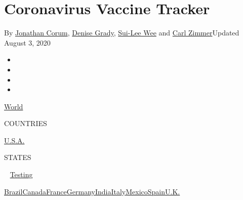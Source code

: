 \hypertarget{coronavirus-vaccine-tracker}{%
\section{Coronavirus Vaccine
Tracker}\label{coronavirus-vaccine-tracker}}

By \href{https://www.nytimes3xbfgragh.onion/by/jonathan-corum}{Jonathan
Corum}, \href{https://www.nytimes3xbfgragh.onion/by/denise-grady}{Denise
Grady}, \href{https://www.nytimes3xbfgragh.onion/by/sui-lee-wee}{Sui-Lee
Wee} and \href{https://www.nytimes3xbfgragh.onion/by/carl-zimmer}{Carl
Zimmer}Updated August 3, 2020

\begin{itemize}
\item
\item
\item
\item
\end{itemize}

\href{https://www.nytimes3xbfgragh.onion/interactive/2020/world/coronavirus-maps.html}{World}~

COUNTRIES

\textbar{}
\href{https://www.nytimes3xbfgragh.onion/interactive/2020/us/coronavirus-us-cases.html}{U.S.A.}~

STATES

~
\href{https://www.nytimes3xbfgragh.onion/interactive/2020/us/coronavirus-testing.html}{Testing}

\href{https://www.nytimes3xbfgragh.onion/interactive/2020/world/americas/brazil-coronavirus-cases.html}{Brazil}\href{https://www.nytimes3xbfgragh.onion/interactive/2020/world/canada/canada-coronavirus-cases.html}{Canada}\href{https://www.nytimes3xbfgragh.onion/interactive/2020/world/europe/france-coronavirus-cases.html}{France}\href{https://www.nytimes3xbfgragh.onion/interactive/2020/world/europe/germany-coronavirus-cases.html}{Germany}\href{https://www.nytimes3xbfgragh.onion/interactive/2020/world/asia/india-coronavirus-cases.html}{India}\href{https://www.nytimes3xbfgragh.onion/interactive/2020/world/europe/italy-coronavirus-cases.html}{Italy}\href{https://www.nytimes3xbfgragh.onion/interactive/2020/world/americas/mexico-coronavirus-cases.html}{Mexico}\href{https://www.nytimes3xbfgragh.onion/interactive/2020/world/europe/spain-coronavirus-cases.html}{Spain}\href{https://www.nytimes3xbfgragh.onion/interactive/2020/world/europe/united-kingdom-coronavirus-cases.html}{U.K.}

